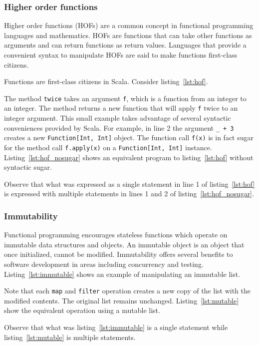 \subsubsection{Higher order functions}
Higher order functions (HOFs) are a common concept in functional programming languages and mathematics.
HOFs are functions that can take other functions as arguments and can return functions as return values.
Languages that provide a convenient syntax to manipulate HOFs are said to make functions first-class citizens.

Functions are first-class citizens in Scala.
Consider listing~\ref{lst:hof}.

The method \texttt{twice} takes an argument \texttt{f}, which is a function from an integer to an integer.
The method returns a new function that will apply \texttt{f} twice to an integer argument.
This small example takes advantage of several syntactic conveniences provided by Scala.
For example, in line 2 the argument \texttt{\_ + 3} creates a new \texttt{Function[Int, Int]} object.
The function call \texttt{f(x)} is in fact sugar for the method call \texttt{f.apply(x)} on a \texttt{Function[Int, Int]} instance.
Listing~\ref{lst:hof_nosugar} shows an equivalent program to listing~\ref{lst:hof} without syntactic sugar.

Observe that what was expressed as a single statement in line 1 of listing~\ref{lst:hof} is expressed with multiple statements in lines 1 and 2 of listing~\ref{lst:hof_nosugar}.

\subsubsection{Immutability}
Functional programming encourages stateless functions which operate on immutable data structures and objects.
An immutable object is an object that once initialized, cannot be modified.
Immutability offers several benefits to software development in areas including concurrency and testing.
Listing~\ref{lst:immutable} shows an example of manipulating an immutable list.

Note that each \texttt{map} and \texttt{filter} operation creates a new copy of the list with the modified contents.
The original list remains unchanged.
Listing~\ref{lst:mutable} show the equivalent operation using a mutable list.

Observe that what was listing~\ref{lst:immutable} is a single statement while listing~\ref{lst:mutable} is multiple statements.

